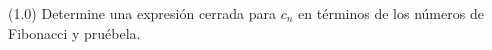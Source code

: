 (1.0) Determine una expresión cerrada para $c_n$ en términos de los números de Fibonacci y pruébela.